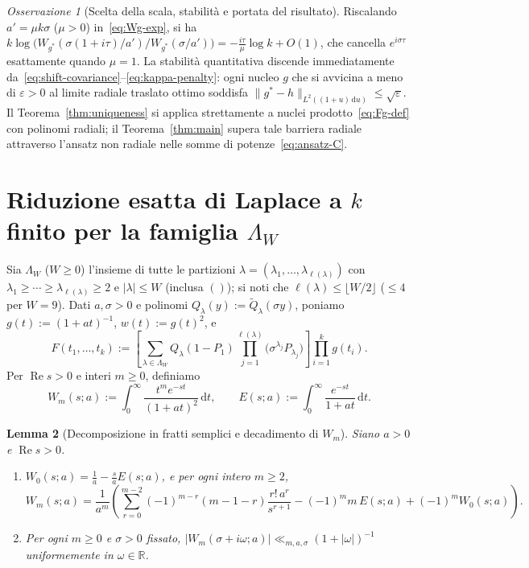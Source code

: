 \documentclass[11pt, reqno]{amsart}
\newtheorem{lemma}{Lemma}[section]
\theoremstyle{remark}
\newtheorem{remark}[lemma]{Osservazione}
\numberwithin{equation}{section}
\DeclareMathOperator{\re}{Re}
\newcommand{\R}{\mathbb{R}}
\newcommand{\dd}{\,\mathrm{d}}
\begin{document}
\begin{remark}[Scelta della scala, stabilità e portata del risultato]
Riscalando $a' = \mu k\sigma$ ($\mu > 0$) in~\eqref{eq:Wg-exp}, si ha
$k\log\bigl(W_{g^*}(\sigma(1+i\tau)/a')/W_{g^*}(\sigma/a')\bigr) = -\frac{i\tau}{\mu}\log k + O(1)$,
che cancella $e^{i\sigma\tau}$ esattamente quando $\mu = 1$. La stabilità quantitativa discende
immediatamente da~\eqref{eq:shift-covariance}--\eqref{eq:kappa-penalty}: ogni nucleo $g$ che si avvicina
a meno di $\varepsilon > 0$ al limite radiale traslato ottimo soddisfa
$\|g^* - h\|_{L^2((1+u)\dd u)} \le \sqrt{\varepsilon}$. Il Teorema~\ref{thm:uniqueness} si applica
strettamente a nuclei prodotto~\eqref{eq:Fg-def} con polinomi radiali; il Teorema~\ref{thm:main}
supera tale barriera radiale attraverso l'ansatz non radiale nelle somme di potenze~\eqref{eq:ansatz-C}.
\end{remark}

\section{Riduzione esatta di Laplace a \texorpdfstring{$k$}{k} finito per la famiglia \texorpdfstring{$\Lambda_W$}{Lambda\_W}}\label{sec:laplace}

Sia $\Lambda_W$ ($W \ge 0$) l'insieme di tutte le partizioni $\lambda = (\lambda_1,\dots,\lambda_{\ell(\lambda)})$
con $\lambda_1 \ge \cdots \ge \lambda_{\ell(\lambda)} \ge 2$ e $|\lambda| \le W$ (inclusa $()$); si noti che
$\ell(\lambda) \le \lfloor W/2 \rfloor$ ($\le 4$ per $W=9$). Dati $a, \sigma > 0$ e polinomi
$Q_\lambda(y) := \widetilde{Q}_\lambda(\sigma y)$, poniamo $g(t) := (1+at)^{-1}$, $w(t) := g(t)^2$, e
\begin{equation}\label{eq:F-LambdaW}
F(t_1,\dots,t_k) := \left[\sum_{\lambda \in \Lambda_W} Q_\lambda(1 - P_1)
\prod_{j=1}^{\ell(\lambda)} \bigl(\sigma^{\lambda_j} P_{\lambda_j}\bigr)\right]
\prod_{i=1}^k g(t_i).
\end{equation}
Per $\re s > 0$ e interi $m \ge 0$, definiamo
\begin{equation}\label{eq:Wm-E-def}
W_m(s; a) := \int_0^\infty \frac{t^m e^{-st}}{(1+at)^2}\dd t,
\qquad
E(s; a) := \int_0^\infty \frac{e^{-st}}{1+at}\dd t.
\end{equation}

\begin{lemma}[Decomposizione in fratti semplici e decadimento di $W_m$]\label{lem:Wm-pf}
Siano $a > 0$ e $\re s > 0$.
\begin{enumerate}
\item[(i)] $W_0(s;a) = \frac{1}{a} - \frac{s}{a} E(s;a)$, e per ogni intero $m \ge 2$,
\begin{equation}\label{eq:Wm-pf}
W_m(s;a) = \frac{1}{a^m}\left(\sum_{r=0}^{m-2} (-1)^{m-r}(m-1-r)\frac{r!\,a^r}{s^{r+1}}
- (-1)^m m\, E(s;a) + (-1)^m W_0(s;a)\right).
\end{equation}
\item[(ii)] Per ogni $m \ge 0$ e $\sigma > 0$ fissato, $|W_m(\sigma + i\omega; a)| \ll_{m,a,\sigma} (1 + |\omega|)^{-1}$
uniformemente in $\omega \in \R$.
\end{enumerate}
\end{lemma}
\end{document}
